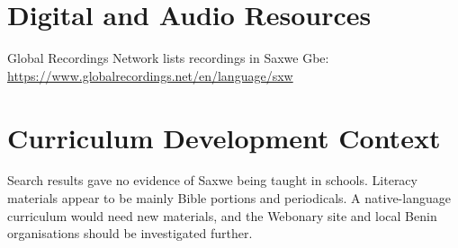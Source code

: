 \documentclass[12pt]{article}
\begin{document}
\section{Digital and Audio Resources}
Global Recordings Network lists recordings in Saxwe Gbe: \url{https://www.globalrecordings.net/en/language/sxw}

\section{Curriculum Development Context}
Search results gave no evidence of Saxwe being taught in schools. Literacy materials appear to be mainly Bible portions and periodicals. A native-language curriculum would need new materials, and the Webonary site and local Benin organisations should be investigated further.
\end{document}
